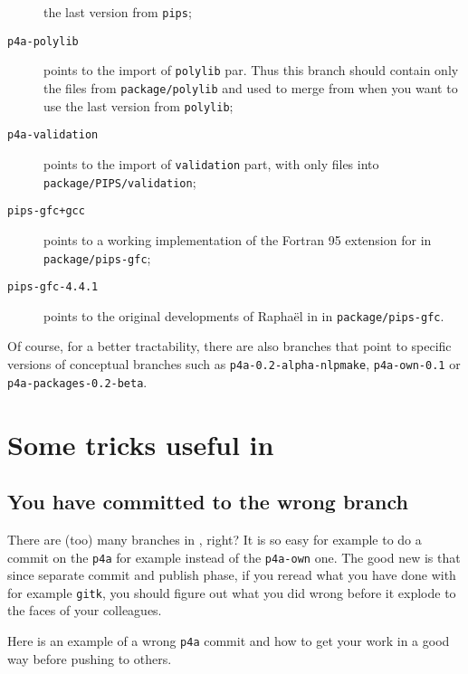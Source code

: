 \documentclass[a4paper]{article}
\begin{document}
\begin{description}
  the last version from \texttt{pips};
\item[\texttt{p4a-polylib}] points to the import of \Apips \texttt{polylib}
  par. Thus this branch should contain only the files from
  \texttt{package/polylib} and used to merge from when you want to use
  the last version from \texttt{polylib};
\item[\texttt{p4a-validation}] points to the import of \Apips
  \texttt{validation} part, with only files into
  \texttt{package/PIPS/validation};
\item[\texttt{pips-gfc+gcc}] points to a working \Apipsgfc implementation
  of the Fortran 95 extension for \Apips in \texttt{package/pips-gfc};
\item[\texttt{pips-gfc-4.4.1}] points to the original developments of
  Raphaël in \Agcc in \texttt{package/pips-gfc}.
\end{description}


Of course, for a better tractability, there are also branches that point
to specific versions of conceptual branches such as
\texttt{p4a-0.2-alpha-nlpmake}, \texttt{p4a-own-0.1} or
\texttt{p4a-packages-0.2-beta}.


\section{Some \protect\Agit tricks useful in \protect\Apfa}
\label{sec:some-agit-tricks}

\subsection{You have committed to the wrong branch}
\label{sec:you-have-comited}

There are (too) many branches in \Apfa, right? It is so easy for example
to do a commit on the \texttt{p4a} for example instead of the
\texttt{p4a-own} one. The good new is that since \Agit separate commit and
publish phase, if you reread what you have done with for example
\texttt{gitk}, you should figure out what you did wrong before it explode
to the faces of your colleagues.

Here is an example of a wrong \texttt{p4a} commit and how to get your work
in a good way before pushing to others.
\end{document}
